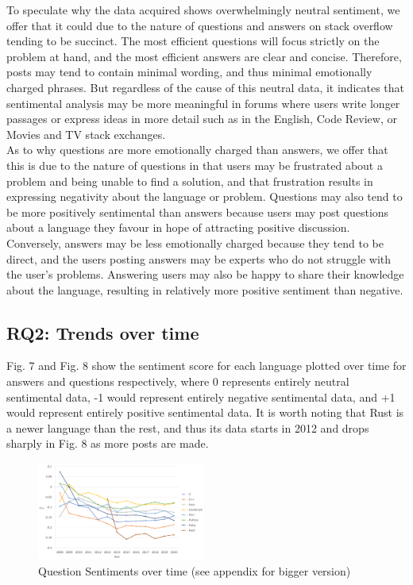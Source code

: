 \documentclass[conference]{IEEEtran}
\begin{document}
To speculate why the data acquired shows overwhelmingly neutral sentiment, we offer that it could due to the nature of questions and answers on stack overflow tending to be succinct. The most efficient questions will focus strictly on the problem at hand, and the most efficient answers are clear and concise. Therefore, posts may tend to contain minimal wording, and thus minimal emotionally charged phrases. But regardless of the cause of this neutral data, it indicates that sentimental analysis may be more meaningful in forums where users write longer passages or express ideas in more detail such as in the English, Code Review, or Movies and TV stack exchanges.\\

As to why questions are more emotionally charged than answers, we offer that this is due to the nature of questions in that users may be frustrated about a problem and being unable to find a solution, and that frustration results in expressing negativity about the language or problem. Questions may also tend to be more positively sentimental than answers because users may post questions about a language they favour in hope of attracting positive discussion. Conversely, answers may be less emotionally charged because they tend to be direct, and the users posting answers may be experts who do not struggle with the user’s problems. Answering users may also be happy to share their knowledge about the language, resulting in relatively more positive sentiment than negative.\\

\subsection{RQ2: Trends over time}
Fig. 7 and Fig. 8 show the sentiment score for each language plotted over time for answers and questions respectively, where 0 represents entirely neutral sentimental data, -1 would represent entirely negative sentimental data, and +1 would represent entirely positive sentimental data. It is worth noting that Rust is a newer language than the rest, and thus its data starts in 2012 and drops sharply in Fig. 8 as more posts are made. \\

\begin{figure}[htbp]
\centerline{\includegraphics[width=0.49\textwidth]{figures/time_questions_em.png}}
\caption{Question Sentiments over time (see appendix for bigger version)}
\label{fig}
\end{figure}
\end{document}
